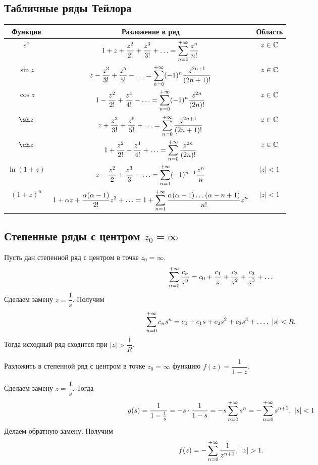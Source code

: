 	\subsection{Табличные ряды Тейлора}
	\vspace{0.5cm}
	\begin{tabular}{|c|c|c|}
		\hline
		\textbf{Функция} & \textbf{Разложение в ряд} & \textbf{Область} \\[8pt]
		\hline
		$e^z$ &
		$\displaystyle 1+z+\frac{z^2}{2!}+\frac{z^3}{3!}+\ldots = \sum\limits_{n=0}^{+\infty}\frac{z^n}{n!}$ & $z\in\mathbb{C}$ \\[12pt]
		\hline
		$\sin z$ &
		$\displaystyle z-\frac{z^3}{3!} + \frac{z^5}{5!} -\ldots = \sum\limits_{n=0}^{+\infty}(-1)^n\frac{z^{2n+1}}{(2n+1)!}$ &
		$z\in\mathbb{C}$ \\[12pt]
		\hline
		$\cos z$ &
		$\displaystyle 1-\frac{z^2}{2!} + \frac{z^4}{4!} - \ldots = \sum\limits_{n=0}^{+\infty}(-1)^n\frac{z^{2n}}{(2n)!}$ &
		$z\in\mathbb{C}$ \\[12pt]
		\hline
		$\sh z$ &
		$\displaystyle z + \frac{z^3}{3!}+\frac{z^5}{5!}+ \ldots = \sum\limits_{n=0}^{+\infty}\frac{z^{2n+1}}{(2n+1)!}$ &
		$z\in\mathbb{C}$ \\[12pt]
		\hline
		$\ch z$ &
		$\displaystyle 1 + \frac{z^2}{2!}+\frac{z^4}{4!}+ \ldots = \sum\limits_{n=0}^{+\infty}\frac{z^{2n}}{(2n)!}$ &
		$z\in\mathbb{C}$ \\[12pt]
		\hline
		$\ln(1+z)$ &
		$\displaystyle z-\frac{z^2}{2}+\frac{z^3}{3}-\ldots = \sum\limits_{n=1}^{+\infty}(-1)^{n-1}\frac{z^n}{n}$ &
		$|z| < 1$ \\[12pt]
		\hline
		$(1+z)^\alpha$ &
		$\displaystyle 1 + \alpha z + \frac{\alpha(\alpha-1)}{2!}z^2+ \ldots = 1+ \sum\limits_{n=1}^{+\infty}\frac{\alpha(\alpha-1)\ldots(\alpha-n+1)}{n!}z^n$ &
		$|z|< 1$ \\[12pt]
		\hline
	\end{tabular}
	\newpage
	\subsection{Степенные ряды с центром $z_0 = \infty$}
	Пусть дан степенной ряд с центром в точке $z_0 = \infty$.
	\[ \sum\limits_{n=0}^{+\infty}\frac{c_n}{z^n} = c_0 + \frac{c_1}{z} +\frac{c_2}{z^2} + \frac{c_3}{z^3} + \ldots \]
	Сделаем замену $z = \dfrac{1}{s}$. Получим
	\[ \sum\limits_{n=0}^{+\infty}c_ns^n = c_0 + c_1s +c_2s^2 + c_3s^3 + \ldots,\ |s|<R. \]
	Тогда исходный ряд сходится при $|z| > \dfrac{1}{R}$.
	\begin{example}
		Разложить в степенной ряд с центром в точке $z_0 = \infty$ функцию $f(z) = \dfrac{1}{1-z}$.
	\end{example}
	\noindent
	Сделаем замену $z = \dfrac{1}{s}$. Тогда
	\[ g(s) = \frac{1}{1-\frac{1}{s}} = -s\cdot\frac{1}{1-s} = -s\sum\limits_{n=0}^{+\infty}s^n = -\sum\limits_{n=0}^{+\infty}s^{n+1},\ |s|<1 \]
	Делаем обратную замену. Получим
	\[ f(z) = -\Sum_{n=0}^{+\infty}\frac{1}{z^{n+1}},\ |z|>1. \]
